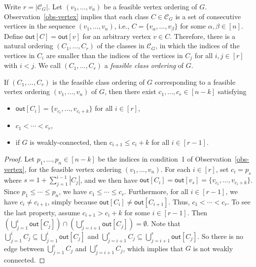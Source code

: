 Write $r = |\mathcal{C}_G|$.
Let $(v_1,\dots,v_n)$ be a feasible vertex ordering of $G$.
Observation~\ref{obs-vertex} implies that each class $C \in \mathcal{C}_G$ is a set of consecutive vertices in the sequence $(v_1,\dots,v_n)$, i.e., $C = \{v_\alpha,\dots,v_\beta\}$ for some $\alpha,\beta \in [n]$.
Define $\mathsf{out}[C] = \mathsf{out}[v]$ for an arbitrary vertex $v \in C$.
Therefore, there is a natural ordering $(C_1,\dots,C_r)$ of the classes in $\mathcal{C}_G$, in which the indices of the vertices in $C_i$ are smaller than the indices of the vertices in $C_j$ for all $i,j \in [r]$ with $i < j$.
We call $(C_1,\dots,C_r)$ a \textit{feasible class ordering} of $G$.

\begin{observation} \label{obs-class}
    If $(C_1,\dots,C_r)$ is the feasible class ordering of $G$ corresponding to a feasible vertex ordering $(v_1,\dots,v_n)$ of $G$, then there exist $c_1,\dots,c_r \in [n-k]$ satisfying
    \begin{itemize}
        \item $\mathsf{out}[C_i] = \{v_{c_i},\dots,v_{c_i+k}\}$ for all $i \in [r]$,
        \item $c_1 < \cdots < c_r$,
        \item if $G$ is weakly-connected, then $c_{i+1} \leq c_i+k$ for all $i \in [r-1]$.
    \end{itemize}
\end{observation}
\begin{proof}
Let $p_1,\dots,p_n \in [n-k]$ be the indices in condition~1 of Observation~\ref{obs-vertex}, for the feasible vertex ordering $(v_1,\dots,v_n)$.
For each $i \in [r]$, set $c_i = p_s$ where $s = 1+ \sum_{j=1}^{i-1} |C_j|$, and we then have $\mathsf{out}[C_i] = \mathsf{out}[v_s] = \{v_{c_i},\dots,v_{c_i+k}\}$.
Since $p_1 \leq \cdots \leq p_n$, we have $c_1 \leq \cdots \leq c_r$.
Furthermore, for all $i \in [r-1]$, we have $c_i \neq c_{i+1}$, simply because $\mathsf{out}[C_i] \neq \mathsf{out}[C_{i+1}]$.
Thus, $c_1 < \cdots < c_r$.
To see the last property, assume $c_{i+1} > c_i+k$ for some $i \in [r-1]$.
Then $(\bigcup_{j=1}^i \mathsf{out}[C_j]) \cap (\bigcup_{j=i+1}^r \mathsf{out}[C_j]) = \emptyset$.
Note that $\bigcup_{j=1}^i C_j \subseteq \bigcup_{j=1}^i \mathsf{out}[C_j]$ and $\bigcup_{j=i+1}^r C_j \subseteq \bigcup_{j=i+1}^r \mathsf{out}[C_j]$.
So there is no edge between $\bigcup_{j=1}^i C_j$ and $\bigcup_{j=i+1}^r C_j$, which implies that $G$ is not weakly connected.
\end{proof}

